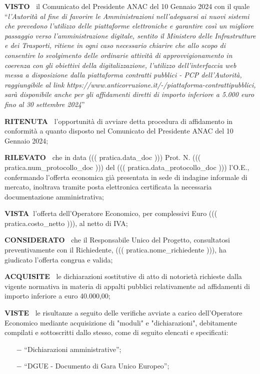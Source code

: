 \documentclass[a4paper,12pt]{letter}
\begin{document}
\textbf{VISTO~} il Comunicato del Presidente ANAC
del 10 Gennaio 2024 con il quale ``\textit{l’Autorità al fine di favorire
le Amministrazioni nell’adeguarsi ai nuovi sistemi che prevedono
l’utilizzo delle piattaforme elettroniche e garantire così un migliore
passaggio verso l’amministrazione digitale, sentito il Ministero
delle Infrastrutture e dei Trasporti, ritiene in ogni caso necessario
chiarire che allo scopo di consentire lo svolgimento delle ordinarie
attività di approvvigionamento in coerenza con gli obiettivi della
digitalizzazione, l’utilizzo dell’interfaccia web messa a disposizione
dalla piattaforma contratti pubblici - PCP dell’Autorità, raggiungibile
al link https://www.anticorruzione.it/-/piattaforma-contrattipubblici,
sarà disponibile anche per gli affidamenti diretti di importo inferiore
a 5.000 euro fino al 30 settembre 2024}''


\textbf{RITENUTA~} l’opportunità di avviare detta
procedura di affidamento in conformità a quanto disposto nel Comunicato
del Presidente ANAC del 10 Gennaio 2024;

\textbf{RILEVATO~} che in data ((( pratica.data_doc )))
Prot. N. ((( pratica.num_protocollo_doc ))) del ((( pratica.data_protocollo_doc )))
l’O.E., confermando l’offerta economica
già presentata in sede di indagine informale di mercato, inoltrava
tramite posta elettronica certificata la necessaria documentazione
amministrativa;

\textbf{VISTA~}l’offerta dell’Operatore
Economico, per complessivi Euro ((( pratica.costo_netto ))), al netto di IVA;

\textbf{CONSIDERATO~} che il Responsabile Unico del
Progetto, consultatosi preventivamente con il 
 Richiedente, ((( pratica.nome_richiedente ))), ha giudicato l’offerta congrua
 e valida;

\textbf{ACQUISITE~}   le dichiarazioni sostitutive
di atto di notorietà richieste dalla vigente normativa in materia di
appalti pubblici relativamente ad affidamenti di importo inferiore a
euro 40.000,00;

\textbf{VISTE~}	le risultanze a seguito delle verifiche avviate a
carico dell’Operatore Economico mediante acquisizione di "moduli" e
"dichiarazioni", debitamente compilati e sottoscritti dallo stesso, come
di seguito elencati e specificati: 

\begin{itemize}
	\item[$-$] ``Dichiarazioni amministrative'';

	\item[$-$] ``DGUE - Documento di Gara Unico Europeo''; 
\end{itemize}
\end{document}
